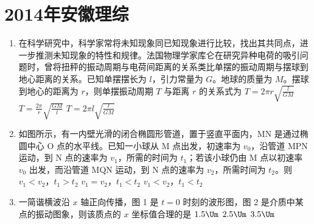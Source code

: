 \documentclass[\gkver]{gaokaozhenti}
\begin{document}
\chapter{2014年安徽理综}

\begin{enumerate}
\item
在科学研究中，科学家常将未知现象同已知现象进行比较，找出其共同点，进一步推测未知现象的特性和规律。法国物理学家库仑在研究异种电荷的吸引问题时，曾将扭秤的振动周期与电荷间距离的关系类比单摆的振动周期与摆球到地心距离的关系。已知单摆摆长为 $l$，引力常量为 $G$。地球的质量为 $M$。摆球到地心的距离为 $r$，则单摆振动周期 $T$ 与距离 $r$ 的关系式为
{$T=2\pi r\sqrt{\frac{l}{GM}}$}
{$T=\frac{2\pi}{r}\sqrt{\frac{GM}{l}}$}
{$T=2\pi l\sqrt{\frac{l}{GM}}$}

\item
如图所示，有一内壁光滑的闭合椭圆形管道，置于竖直平面内，MN 是通过椭圆中心 O 点的水平线。已知一小球从 M 点出发，初速率为 $v_{0}$，沿管道 MPN 运动，到 N 点的速率为 $v_{1}$，所需的时间为 $t_{1}$；若该小球仍由 M 点以初速率 $v_{0}$ 出发，而沿管道 MQN 运动，到 N 点的速率为 $v_{2}$，所需时间为 $t_{2}$。则
\onepicture[align=right, w=3.12cm]{}
{$v_{1}<v_{2}$，$t_{1}>t_{2}$}
{$v_{1}=v_{2}$，$t_{1}<t_{2}$}
{$v_{1}<v_{2}$，$t_{1}<t_{2}$}

\item
一简谐横波沿 $x$ 轴正向传播，图 1 是 $t=0$ 时刻的波形图，图 2 是介质中某点的振动图象，则该质点的 $x$ 坐标值合理的是
\onepicture[w=9.00cm]{}
\fourchoices[answer=C]
{$0.5\Um$}
{$1.5\Um$}
{$2.5\Um$}
{$3.5\Um$}


\end{enumerate}
\end{document}

